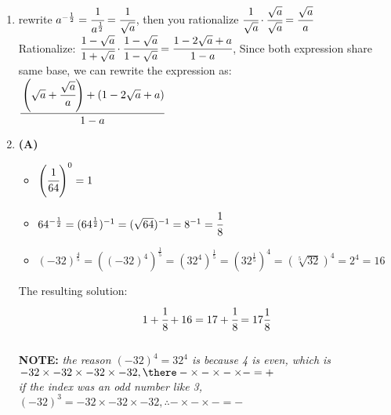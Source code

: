 \begin{multicols}{2}
\begin{enumerate}[label={\arabic*.}]
\begin{tabular}{c|c}
    \end{tabular}
    \item rewrite $a^{-\frac{1}{2}} = \cfrac{1}{a^{\frac{1}{2}}} = \cfrac{1}{\sqrt{a}}$, then you rationalize $ \cfrac{1}{\sqrt{a}} \cdot \cfrac{\sqrt{a}}{\sqrt{a}} = \cfrac{\sqrt{a}}{a}$ \\
     Rationalize: $\cfrac{1-\sqrt{a}}{1+\sqrt{a}} \cdot \cfrac{1-\sqrt{a}}{1-\sqrt{a}} = \cfrac{1-2\sqrt{a} + a}{1-a} $, Since both expression share same base, we can rewrite the expression as: \\
     $\cfrac{\left(\sqrt{a} + \cfrac{\sqrt{a}}{a}\right) + (1-2\sqrt{a} + a) }{1-a}$
    
    
    \item \textbf{(A)}
    \begin{itemize} 
    \item $\left(\cfrac{1}{64}\right)^0 = 1$\\
    \item $64^{-\frac{1}{2}} = (64^{\frac{1}{2}})^{-1} = (\sqrt{64})^{-1}= 8^{-1} = \cfrac{1}{8}$ \\
    \item $(-32)^{\frac{4}{5}} = ((-32)^4)^{\frac{1}{5}} = (32^4)^{\frac{1}{5}} = (32^{\frac{1}{5}})^4 = \left(\sqrt[5]{32}\right)^4 = 2^4 = 16$
    \end{itemize}
    The resulting solution: \\
    $$1 + \cfrac{1}{8} + 16 = 17 + \cfrac{1}{8} = 17\frac{1}{8}$$ \\
    \textbf{NOTE:} \textit{the reason $(-32)^4 = 32^4$  is because 4 is even, which is $-32 \times -32 \times -32 \times -32, \there - \times - \times - \times - = +$ \\
    if the index was an odd number like 3, $(-32)^3 = -32 \times -32 \times -32, \therefore - \times - \times - = -$ }


\end{enumerate}
\end{multicols}
